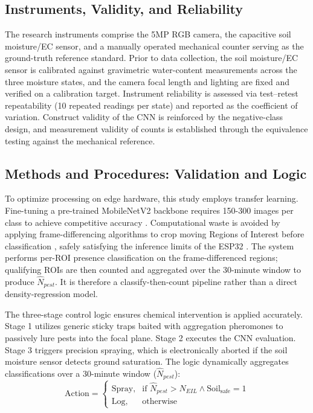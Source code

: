 \documentclass[conference]{IEEEtran}
\begin{document}
\subsection{Instruments, Validity, and Reliability}
The research instruments comprise the 5MP RGB camera, the capacitive soil moisture/EC sensor, and a manually operated mechanical counter serving as the ground-truth reference standard. Prior to data collection, the soil moisture/EC sensor is calibrated against gravimetric water-content measurements across the three moisture states, and the camera focal length and lighting are fixed and verified on a calibration target. Instrument reliability is assessed via test--retest repeatability (10 repeated readings per state) and reported as the coefficient of variation. Construct validity of the CNN is reinforced by the negative-class design, and measurement validity of counts is established through the equivalence testing against the mechanical reference.

\subsection{Methods and Procedures: Validation and Logic}
To optimize processing on edge hardware, this study employs transfer learning. Fine-tuning a pre-trained MobileNetV2 backbone requires 150-300 images per class to achieve competitive accuracy \cite{hayajneh2023}. Computational waste is avoided by applying frame-differencing algorithms to crop moving Regions of Interest before classification \cite{prasetyo2022,chaudhari2023}, safely satisfying the inference limits of the ESP32 \cite{donskoy2025}. The system performs per-ROI presence classification on the frame-differenced regions; qualifying ROIs are then counted and aggregated over the 30-minute window to produce $\hat{N}_{pest}$. It is therefore a classify-then-count pipeline rather than a direct density-regression model.

The three-stage control logic ensures chemical intervention is applied accurately. Stage 1 utilizes generic sticky traps baited with aggregation pheromones \cite{klassen2023} to passively lure pests into the focal plane. Stage 2 executes the CNN evaluation. Stage 3 triggers precision spraying, which is electronically aborted if the soil moisture sensor detects ground saturation. The logic dynamically aggregates classifications over a 30-minute window ($\hat{N}_{pest}$):
\begin{equation}
\text{Action} =
\begin{cases}
\text{Spray}, & \text{if } \hat{N}_{pest} > N_{EIL} \land \text{Soil}_{\text{safe}} = 1 \\
\text{Log}, & \text{otherwise}
\end{cases}
\end{equation}
\end{document}
